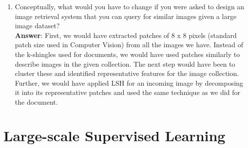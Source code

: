 \documentclass[11pt]{article}
\begin{document}
\begin{enumerate}
\item Conceptually, what would you have to change if you were asked to design an image
  retrieval system that you can query for similar images given a large image
  dataset? \\

\textbf{Answer}: First, we would have extracted patches of 8 x 8 pixels
(standard patch size used in Computer Vision) from all the images we
have. Instead of the k-shingles used for documents, we would have used patches
similarly to describe images in the given collection. The next step
would have been to cluster these and identified representative features
for the image collection. Further, we would have applied LSH for an
incoming image by decomposing it into its representative patches and
used the same technique as we did for the document.

\end{enumerate}

\section{Large-scale Supervised Learning}
\end{document}
